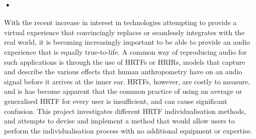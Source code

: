 \subsubsection{•}
With the recent increase in interest in technologies attempting to provide a virtual experience that convincingly replaces or seamlessly integrates with the real world, it is becoming increasingly important to be able to provide an audio experience that is equally true-to-life. A common way of reproducing audio for such applications is through the use of HRTFs or HRIRs, models that capture and describe the various effects that human anthropometry have on an audio signal before it arrives at the inner ear. HRTFs, however, are costly to measure, and is has become apparent that the common practice of using an average or generalised HRTF for every user is insufficient, and can cause significant confusion. This project investigates different HRTF individualisation methods, and attempts to devise and implement a method that would allow users to perform the individualisation process with no additional equipment or expertise. 